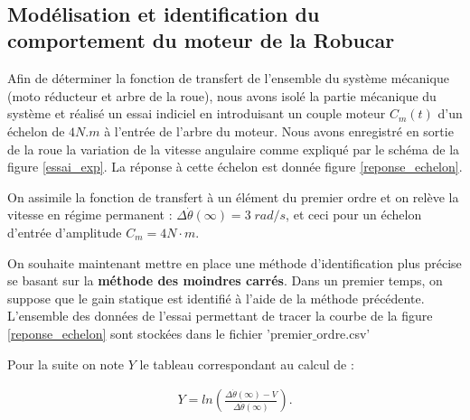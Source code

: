 \exer{[robucar]}
\setcounter{numques}{0}~\\

\subsection{Modélisation et identification du comportement du moteur de la Robucar}

Afin de déterminer la fonction de transfert de l'ensemble du système mécanique (moto réducteur et arbre de la roue), nous avons isolé la partie mécanique du système et réalisé un essai indiciel en introduisant un couple moteur $C_m(t)$ d'un échelon de $4N.m$ à l'entrée de l'arbre du moteur. Nous avons enregistré en sortie de la roue la variation de la vitesse angulaire comme expliqué par le schéma de la figure \ref{essai_exp}. La réponse à cette échelon est donnée figure \ref{reponse_echelon}.

On assimile la fonction de transfert à un élément du premier ordre et on relève la vitesse en régime permanent : $\Delta \dot{\theta}(\infty)=3\;rad/s$, et ceci pour un échelon d'entrée d'amplitude $C_m=4N\cdot m$.



On souhaite maintenant mettre en place une méthode d'identification plus précise se basant sur la \textbf{méthode des moindres carrés}.
Dans un premier temps, on suppose que le gain statique est identifié à l'aide de la méthode précédente.
L'ensemble des données de l'essai permettant de tracer la courbe de la figure \ref{reponse_echelon} sont stockées dans le fichier 'premier$\_$ordre.csv'



Pour la suite on note $Y$ le tableau correspondant au calcul de : 

\begin{align*}
Y=ln\left(\frac{\Delta \dot{\theta}(\infty)-V}{\Delta \dot{\theta}(\infty)}\right).
\end{align*}

